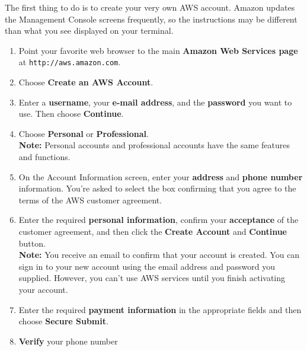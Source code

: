 \documentclass[]{book}
\providecommand{\tightlist}{%
  \setlength{\itemsep}{0pt}\setlength{\parskip}{0pt}}
\begin{document}
The first thing to do is to create your very own AWS account. Amazon updates the Management Console screens frequently, so the instructions may be different than what you see displayed on your terminal.

\begin{enumerate}
\def\labelenumi{\arabic{enumi}.}
\tightlist
\item
  Point your favorite web browser to the main \textbf{Amazon Web Services page} at \texttt{http://aws.amazon.com}.
\item
  Choose \textbf{Create an AWS Account}.
\item
  Enter a \textbf{username}, your \textbf{e-mail address}, and the \textbf{password} you want to use. Then choose \textbf{Continue}.
\item
  Choose \textbf{Personal} or \textbf{Professional}.\\
  \textbf{Note:} Personal accounts and professional accounts have the same features and functions.
\item
  On the Account Information screen, enter your \textbf{address} and \textbf{phone number} information. You're asked to select the box confirming that you agree to the terms of the AWS customer agreement.
\item
  Enter the required \textbf{personal information}, confirm your \textbf{acceptance} of the customer agreement, and then click the \textbf{Create Account} and \textbf{Continue} button.\\
  \textbf{Note:} You receive an email to confirm that your account is created. You can sign in to your new account using the email address and password you supplied. However, you can't use AWS services until you finish activating your account.
\item
  Enter the required \textbf{payment information} in the appropriate fields and then choose \textbf{Secure Submit}.
\item
  \textbf{Verify} your phone number


\end{enumerate}
\end{document}
